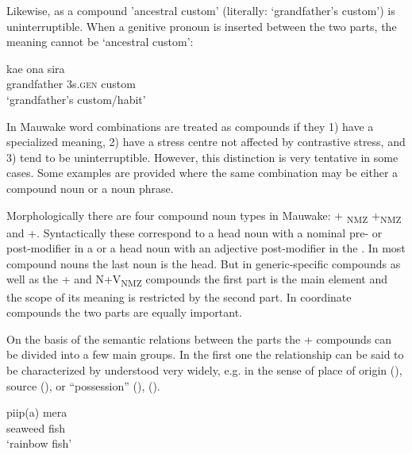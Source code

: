 Likewise, as a compound  'ancestral custom' (literally: `grandfather's custom') is uninterruptible. When a genitive pronoun is inserted between the two parts, the meaning cannot be `ancestral custom':

\ea%
\label{ex:x1860}
\gll kae ona sira \\
grandfather 3s.\textsc{gen} custom\\
\glt`grandfather's custom/habit'
\z

In Mauwake word combinations are treated as compounds if they 1) have a specialized meaning, 2) have a stress centre not affected by contrastive stress, and 3) tend to be uninterruptible. However, this distinction is very tentative in some cases. Some examples are provided where the same combination may be either a compound noun or a noun phrase.

Morphologically there are four compound noun types in Mauwake: + \textsubscript{NMZ}\textstyleAcronymallcaps{} +\textsubscript{NMZ}\textstyleAcronymallcaps{ } and +. Syntactically these correspond to a head noun with a nominal pre- or post-modifier in a  or a head noun with an adjective post-modifier in the . In most compound nouns the last noun is the head. But in generic-specific compounds as well as the + and\textstyleAcronymallcaps{} \textsc{N+V}\textsubscript{NMZ} compounds the first part is the main element and the scope of its meaning is restricted by the second part. In coordinate compounds the two parts are equally important.

On the basis of the semantic relations between the parts the + compounds can be divided into a few main groups. In the first one the relationship can be said to be characterized by  understood very widely, e.g. in the sense of place of origin (), source (), or ``possession'' (), (). 

\ea%
\label{ex:x37}
\gll piip(a) mera \\
seaweed fish\\
\glt`rainbow fish'
\z

